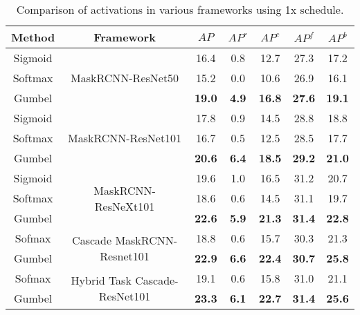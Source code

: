 \documentclass[runningheads]{llncs}
\begin{document}
\begin{table}
    \centering
    \caption{Comparison of activations in various frameworks using 1x schedule.}
    \begin{tabular}{c|c|c|c|c|c|c}
         Method& Framework& $AP$ &$AP^r$  &$AP^c$  &$AP^f$  &$AP^b$  \\
         \hline
         Sigmoid& \multirow{ 3}{*}{MaskRCNN-ResNet50\cite{he2017mask}} &16.4 &0.8 &12.7 &27.3 &17.2 \\
         Softmax& &15.2 & 0.0& 10.6 &26.9&16.1\\
         Gumbel& & \textbf{19.0}&\textbf{4.9}&\textbf{16.8}&\textbf{27.6}&\textbf{19.1}\\
         \hline
         Sigmoid& \multirow{ 3}{*}{MaskRCNN-ResNet101} &17.8 &0.9 &14.5 &28.8 &18.8\\
         Softmax& &16.7 & 0.5& 12.5 &28.5&17.7\\
         Gumbel& & \textbf{20.6}&\textbf{6.4}&\textbf{18.5}&\textbf{29.2}&\textbf{21.0}\\
         \hline
         Sigmoid&\multirow{ 3}{*}{MaskRCNN-ResNeXt101} &19.6 &1.0&16.5 &31.2&20.7\\
         Softmax& &18.6 &0.6&14.5 &31.1&19.7\\
         Gumbel& & \textbf{22.6}&\textbf{5.9}&\textbf{21.3}&\textbf{31.4}&\textbf{22.8}\\
         \hline
         Sofmax&\multirow{ 2}{*}{Cascade MaskRCNN-Resnet101\cite{cai2019cascade}}  &18.8  &0.6 &15.7 &30.3 &21.3\\
         Gumbel& & \textbf{22.9} &\textbf{6.6}&\textbf{22.4}&\textbf{30.7}&\textbf{25.8}\\
         \hline
         Sofmax&\multirow{ 2}{*}{Hybrid Task Cascade-ResNet101\cite{chen2019hybrid}}  &19.1  &0.6  &15.8  &31.0 &21.1\\
         Gumbel& &\textbf{23.3}&\textbf{6.1} &\textbf{22.7}&\textbf{31.4}&\textbf{25.6}\\
    \end{tabular}
    \label{tab:detailed_larger_models}
\end{table}
\end{document}
